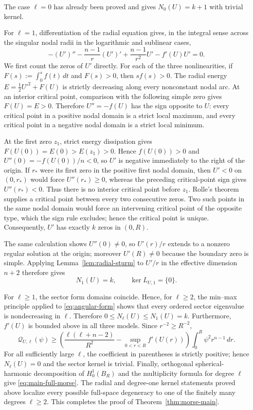 \documentclass[11pt]{article}
\begin{document}
The case $\ell=0$ has already been proved and gives $N_0(U)=k+1$ with
trivial kernel. {For $\ell=1$, differentiation of the radial equation gives, in
the integral sense across the singular nodal radii in the logarithmic and
sublinear cases,
\begin{equation*}
 -(U')''-\frac{n-1}{r}(U')'
 +\frac{n-1}{r^2}U'-f'(U)U'=0.
\end{equation*}
We first count the zeros of $U'$ directly.  For each of the three
nonlinearities, if $F(s):=\int_0^s f(t)\,dt$ and $F(s)>0$, then
$sf(s)>0$.  The radial energy
$E=\frac12U'^2+F(U)$ is strictly decreasing along every nonconstant nodal
arc.  At an interior critical point, comparison with the following simple
zero gives $F(U)=E>0$.  Therefore $U''=-f(U)$ has the sign opposite to $U$:
every critical point in a positive nodal domain is a strict local maximum,
and every critical point in a negative nodal domain is a strict local
minimum.

At the first zero $z_1$, strict energy dissipation gives
$F(U(0))=E(0)>E(z_1)>0$.  Hence $f(U(0))>0$ and
$U''(0)=-f(U(0))/n<0$, so $U'$ is negative immediately to the right of
the origin.  If $r_*$ were its first zero in the positive first nodal domain,
then $U'<0$ on $(0,r_*)$ would force $U''(r_*)\ge0$, whereas the preceding
critical-point sign gives $U''(r_*)<0$.  Thus there is no interior critical
point before $z_1$.  Rolle's theorem supplies a critical point between every
two consecutive zeros.  Two such points in the same nodal domain would force
an intervening critical point of the opposite type, which the sign rule
excludes; hence the critical point is unique.  Consequently, $U'$ has exactly
$k$ zeros in $(0,R)$.

The same calculation shows $U''(0)\ne0$, so $U'(r)/r$ extends to a nonzero
regular solution at the origin; moreover $U'(R)\ne0$ because the boundary
zero is simple.  Applying Lemma~\ref{lem:radial-sturm} to $U'/r$ in the
effective dimension $n+2$ therefore gives
\[
 N_1(U)=k,
 \qquad \ker L_{U,1}=\{0\}.
\]}

{For $\ell\ge1$, the sector form domains coincide.  Hence, for
$\ell\ge2$, the min--max principle applied to \eqref{eq:angular-form} shows
that every ordered sector eigenvalue is nondecreasing in $\ell$.  Therefore
$0\le N_\ell(U)\le N_1(U)=k$.}
Furthermore, $f'(U)$ is bounded above in all three models. Since
$r^{-2}\ge R^{-2}$,
\[
 \mathcal Q_{U,\ell}(\psi)
 \ge\left(\frac{\ell(\ell+n-2)}{R^2}
 -\sup_{0<r<R}f'(U(r))\right)
 \int_0^R\psi^2r^{n-1}\,dr.
\]
{For all sufficiently large $\ell$, the coefficient in parentheses is
strictly positive; hence $N_\ell(U)=0$ and the sector kernel is trivial.
Finally, orthogonal spherical-harmonic decomposition of $H_0^1(B_R)$ and the
multiplicity formula for degree $\ell$ give
\eqref{eq:main-full-morse}.} The radial and degree-one kernel
statements proved above localize every possible full-space degeneracy to one
of the finitely many degrees $\ell\ge2$. This completes the proof of
Theorem~\ref{thm:morse-main}.
\end{document}
